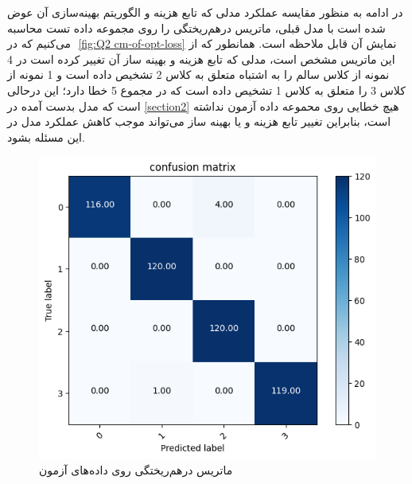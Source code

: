 \documentclass{article}
\begin{document}
در ادامه به منظور مقایسه عملکرد مدلی که تابع هزینه و الگوریتم بهینه‌سازی آن عوض شده است با مدل قبلی، ماتریس درهم‌ریختگی را روی مجموعه داده تست محاسبه می‌کنیم که در ‎
\autoref{fig:Q2 cm-of-opt-loss}
نمایش آن قابل ملاحظه است. همانطور که از این ماتریس مشخص است، مدلی که تابع هزینه و بهینه ساز آن تغییر کرده است در 4 نمونه از کلاس سالم را به اشتباه متعلق به کلاس 2 تشخیص داده است و 1 نمونه از کلاس 3 را متعلق به کلاس 1 تشخیص داده است که در مجموع 5 خطا دارد؛ این درحالی است که مدل بدست آمده در
\autoref{section2}
هیچ خطایی روی محموعه داده آزمون نداشته است، بنابراین تغییر تابع هزینه و یا بهینه ساز می‌تواند موجب کاهش عملکرد مدل در این مسئله بشود.  
\begin{figure}[H]
\centering
\includegraphics[width=0.5\linewidth]{"img/Q2/cm of opt loss"}
\caption{ماتریس درهم‌ریختگی روی داده‌های آزمون}
\label{fig:Q2 cm-of-opt-loss}
\end{figure}



























\end{document}
